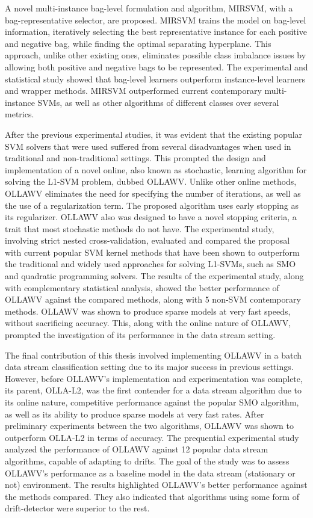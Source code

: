 \documentclass[reqno]{vcuthesis}
\numberwithin{equation}{chapter}
\begin{document}
A novel multi-instance bag-level formulation and algorithm, MIRSVM, with a bag-representative selector, are proposed. MIRSVM trains the model on bag-level information, iteratively selecting the best representative instance for each positive and negative bag, while finding the optimal separating hyperplane. This approach, unlike other existing ones, eliminates possible class imbalance issues by allowing both positive and negative bags to be represented. The experimental and statistical study showed that bag-level learners outperform instance-level learners and wrapper methods. MIRSVM outperformed current contemporary multi-instance SVMs, as well as other algorithms of different classes over several metrics.

After the previous experimental studies, it was evident that the existing popular SVM solvers that were used suffered from several disadvantages when used in traditional and non-traditional settings. This prompted the design and implementation of a novel online, also known as stochastic, learning algorithm for solving the L1-SVM problem, dubbed OLLAWV. Unlike other online methods, OLLAWV eliminates the need for specifying the number of iterations, as well as the use of a regularization term. The proposed algorithm uses early stopping as its regularizer. OLLAWV also was designed to have a novel stopping criteria, a trait that most stochastic methods do not have. The experimental study, involving strict nested cross-validation, evaluated and compared the proposal with current popular SVM kernel methods that have been shown to outperform the traditional and widely used approaches for solving L1-SVMs, such as SMO and quadratic programming solvers. The results of the experimental study, along with complementary statistical analysis, showed the better performance of OLLAWV against the compared methods, along with 5 non-SVM contemporary methods. OLLAWV was shown to produce sparse models at very fast speeds, without sacrificing accuracy. This, along with the online nature of OLLAWV, prompted the investigation of its performance in the data stream setting. 

The final contribution of this thesis involved implementing OLLAWV in a batch data stream classification setting due to its major success in previous settings. However, before OLLAWV's implementation and experimentation was complete, its parent, OLLA-L2, was the first contender for a data stream algorithm due to its online nature, competitive performance against the popular SMO algorithm, as well as its ability to produce sparse models at very fast rates. After preliminary experiments between the two algorithms, OLLAWV was shown to outperform OLLA-L2 in terms of accuracy. The prequential experimental study analyzed the performance of OLLAWV against 12 popular data stream algorithms, capable of adapting to drifts. The goal of the study was to assess OLLAWV's performance as a baseline model in the data stream (stationary or not) environment. The results highlighted OLLAWV's better performance against the methods compared. They also indicated that algorithms using some form of drift-detector were superior to the rest.
\end{document}
